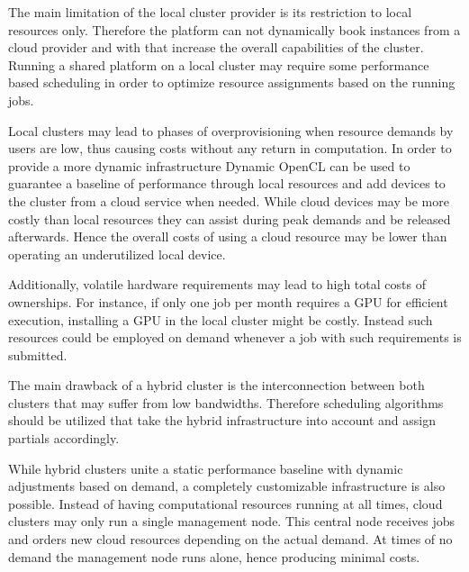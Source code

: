 \begin{description}[style=nextline]
	The main limitation of the local cluster provider is its restriction to local resources only. Therefore the platform can not dynamically book instances from a cloud provider and with that increase the overall capabilities of the cluster. Running a shared platform on a local cluster may require some performance based scheduling in order to optimize resource assignments based on the running jobs.
	
	\item[Hybrid Cloud Provider] 
	Local clusters may lead to phases of overprovisioning when resource demands by users are low, thus causing costs without any return in computation. In order to provide a more dynamic infrastructure Dynamic OpenCL can be used to guarantee a baseline of performance through local resources and add devices to the cluster from a cloud service when needed. While cloud devices may be more costly than local resources they can assist during peak demands and be released afterwards. Hence the overall costs of using a cloud resource may be lower than operating an underutilized local device.
	
	Additionally, volatile hardware requirements may lead to high total costs of ownerships. For instance, if only one job per month requires a GPU for efficient execution, installing a GPU in the local cluster might be costly. Instead such resources could be employed on demand whenever a job with such requirements is submitted.
	
	The main drawback of a hybrid cluster is the interconnection between both clusters that may suffer from low bandwidths. Therefore scheduling algorithms should be utilized that take the hybrid infrastructure into account and assign partials accordingly.
	
	\item[Cloud Cluster Provider]
	While hybrid clusters unite a static performance baseline with dynamic adjustments based on demand, a completely customizable infrastructure is also possible. Instead of having computational resources running at all times, cloud clusters may only run a single management node. This central node receives jobs and orders new cloud resources depending on the actual demand. At times of no demand the management node runs alone, hence producing minimal costs.
	
	
\end{description}

